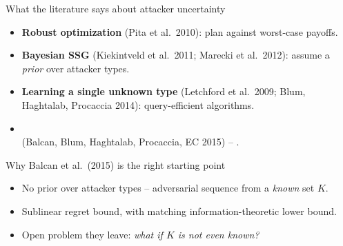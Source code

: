 \documentclass[10pt,aspectratio=169]{beamer}
\newcommand{\impterm}[1]{\textbf{\color{blueprimary}{#1}}}
\newcommand{\impcompterm}[1]{\textbf{\color{darkgreen}{#1}}}
\newenvironment{greenblock}[1]{\begin{exampleblock}{#1}}{\end{exampleblock}}
\begin{document}
\begin{frame}{What the literature says about attacker uncertainty}
\begin{itemize}
  \item \textbf{Robust optimization} (Pita et al.\ 2010): plan against worst-case payoffs.
  \item \textbf{Bayesian SSG} (Kiekintveld et al.\ 2011; Marecki et al.\ 2012): assume a \emph{prior} over attacker types.
  \item \textbf{Learning a single unknown type} (Letchford et al.\ 2009; Blum, Haghtalab, Procaccia 2014): query-efficient algorithms.
  \item \impcompterm{Online learning against an adversarial sequence of types}\\
        (Balcan, Blum, Haghtalab, Procaccia, EC 2015) -- \impterm{our base paper}.
\end{itemize}
\pause
\begin{greenblock}{Why Balcan et al.\ (2015) is the right starting point}
\begin{itemize}
  \item No prior over attacker types -- adversarial sequence from a \emph{known} set $K$.
  \item Sublinear regret bound, with matching information-theoretic lower bound.
  \item Open problem they leave: \emph{what if $K$ is not even known?}
\end{itemize}
\end{greenblock}
\end{frame}
\end{document}
